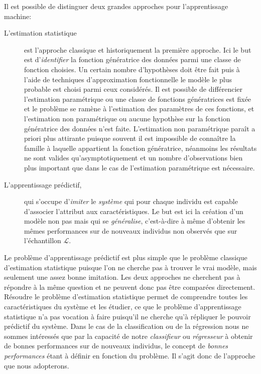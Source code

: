 Il est possible de distinguer deux grandes approches pour l'apprentissage machine:
\begin{description}
    \item[L'estimation statistique] est l'approche classique et historiquement la première approche. Ici le but est d'\emph{identifier} la fonction génératrice des données parmi une classe de fonction choisies. Un certain nombre d'hypothèses doit être fait puis à l'aide de techniques d'approximation fonctionnelle le modèle le plus probable est choisi parmi ceux considérés. Il est possible de différencier l'estimation paramétrique ou une classe de fonctions génératrices est fixée et le problème se ramène à l'estimation des paramètres de ces fonctions, et l'estimation non paramétrique ou aucune hypothèse sur la fonction génératrice des données n'est faite. L'estimation non paramétrique paraît a priori plus attirante puisque souvent il est impossible de connaître la famille à laquelle appartient la fonction génératrice, néanmoins les résultats ne sont valides qu'asymptotiquement et un nombre d'observations bien plus important que dans le cas de l'estimation paramétrique est nécessaire.
    \item[L'apprentissage prédictif,] qui s'occupe d'\emph{imiter} le \emph{système} qui pour chaque individu est capable d'associer l'attribut aux caractéristiques. Le but est ici la création d'un modèle non pas  mais qui se \emph{généralise}, c'est-à-dire à même d'obtenir les mêmes performances sur de nouveaux individus non observés que sur l'échantillon $\mathcal{L}$.
\end{description}

Le problème d'apprentissage prédictif est plus simple que le problème classique d'estimation statistique puisque l'on ne cherche pas à trouver le vrai modèle, mais seulement une assez bonne imitation. Les deux approches ne cherchent pas à répondre à la même question et ne peuvent donc pas être comparées directement. Résoudre le problème d'estimation statistique permet de comprendre toutes les caractéristiques du système et les étudier, ce que le problème d'apprentissage statistique n'a pas vocation à faire puisqu'il ne cherche qu'à répliquer le pouvoir prédictif du système. Dans le cas de la classification ou de la régression nous ne sommes intéressés que par la capacité de notre \emph{classifieur} ou \emph{régresseur} à obtenir de bonnes performances sur de nouveaux individus, le concept de \emph{bonnes performances} étant à définir en fonction du problème. Il s'agit donc de l'approche que nous adopterons.

